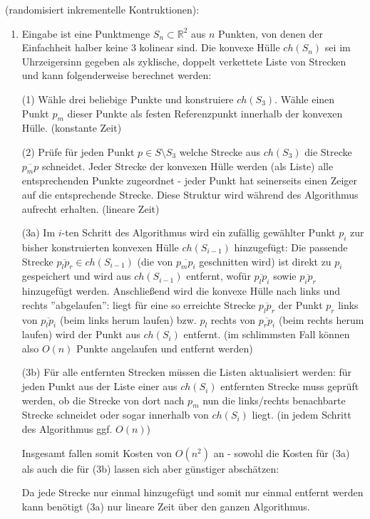 \documentclass[a4paper, titlepage=false, parskip=full-, 10pt]{scrartcl}
\newcounter{tasknbr}
\newenvironment{task}[1]{{\bf Aufgabe \arabic {tasknbr}\stepcounter{tasknbr}} (#1):\begin{enumerate}}{\end{enumerate}}
\newcommand{\subtask}[1]{\item[#1)]}
\begin{document}
\newpage
\begin{task}{randomisiert inkrementelle Kontruktionen}
\subtask{a}
Eingabe ist eine Punktmenge $S_n\subset\mathbb{R}^2$ aus $n$ Punkten, von denen der Einfachheit halber keine 3 kolinear sind. Die konvexe Hülle $ch(S_n)$ sei im Uhrzeigersinn gegeben als zyklische, doppelt verkettete Liste von Strecken und kann folgenderweise berechnet werden:

(1) Wähle drei beliebige Punkte und konstruiere $ch(S_3)$. Wähle einen Punkt $p_m$ dieser Punkte als festen Referenzpunkt innerhalb der konvexen Hülle. (konstante Zeit)

(2) Prüfe für jeden Punkt $p\in S\setminus S_3$ welche Strecke aus $ch(S_3)$ die Strecke $\overline{p_mp}$ schneidet. Jeder Strecke der konvexen Hülle werden (als Liste) alle entsprechenden Punkte zugeordnet - jeder Punkt hat seinerseits einen Zeiger auf die entsprechende Strecke. Diese Struktur wird während des Algorithmus aufrecht erhalten. (lineare Zeit)

(3a) Im $i$-ten Schritt des Algorithmus wird ein zufällig gewählter Punkt $p_i$ zur bisher konstruierten konvexen Hülle $ch(S_{i-1})$ hinzugefügt: Die passende Strecke $\overline{p_lp_r}\in ch(S_{i-1})$ (die von $\overline{p_mp_i}$ geschnitten wird) ist direkt zu $p_i$ gespeichert und wird aus $ch(S_{i-1})$ entfernt, wofür $\overline{p_lp_i}$ sowie $\overline{p_ip_r}$ hinzugefügt werden. Anschließend wird die konvexe Hülle nach links und rechts ''abgelaufen'': liegt für eine so erreichte Strecke $\overline{p_lp_r}$ der Punkt $p_r$ links von $\overline{p_lp_i}$ (beim links herum laufen) bzw. $p_l$ rechts von $\overline{p_rp_i}$ (beim rechts herum laufen) wird der Punkt aus $ch(S_i)$ entfernt. (im schlimmsten Fall können also $O(n)$ Punkte angelaufen und entfernt werden)

(3b) Für alle entfernten Strecken müssen die Listen aktualisiert werden: für jeden Punkt aus der Liste einer aus $ch(S_i)$ entfernten Strecke muss geprüft werden, ob die Strecke von dort nach $p_m$ nun die links/rechts benachbarte Strecke schneidet oder sogar innerhalb von $ch(S_i)$ liegt. (in jedem Schritt des Algorithmus ggf. $O(n)$)

Insgesamt fallen somit Kosten von $O(n^2)$ an - sowohl die Kosten für (3a) als auch die für (3b) lassen sich aber günstiger abschätzen:

Da jede Strecke nur einmal hinzugefügt und somit nur einmal entfernt werden kann benötigt (3a) nur lineare Zeit über den ganzen Algorithmus.


\end{task}
\end{document}
